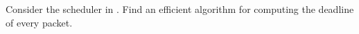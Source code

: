 \begin{problem}
Consider the scheduler in . Find an
efficient algorithm for computing the deadline of every packet.
\end{problem}

